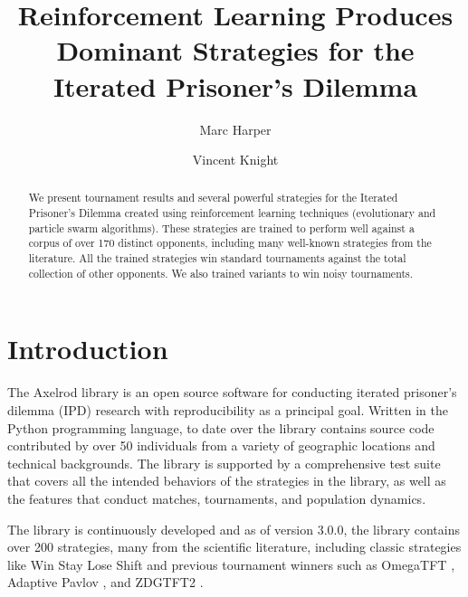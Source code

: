 \documentclass{article}
\title{Reinforcement Learning Produces Dominant Strategies for the
Iterated Prisoner's Dilemma}
\author{Marc Harper \and Vincent Knight} %
\date{}
\begin{document}
\maketitle

\begin{abstract}
    We present tournament results and several powerful strategies for the Iterated
    Prisoner's Dilemma created using reinforcement learning techniques
    (evolutionary and particle swarm algorithms). These strategies are
    trained to perform well against a corpus of over 170 distinct
    opponents, including many well-known strategies from the literature. All
    the trained strategies win standard tournaments against the total collection
    of other opponents. We also trained variants to win noisy tournaments.
\end{abstract}

\section{Introduction}\label{sec:introduction}

The Axelrod library \cite{axelrodproject, knight2016open} is an open source
software for conducting iterated prisoner's dilemma (IPD) research with
reproducibility as a principal goal. Written in the Python programming language,
to date over the library contains source code contributed by over 50 individuals
from a variety of geographic locations and technical backgrounds. The library
is supported by a comprehensive test suite that covers all the intended
behaviors of the strategies in the library, as well as the features that
conduct matches, tournaments, and population dynamics.

The library is continuously developed and as of version 3.0.0, the library
contains over 200 strategies, many from the scientific literature, including
classic strategies like Win Stay Lose Shift \cite{nowak1993strategy} and
previous tournament winners such as OmegaTFT \cite{slany2007some}, Adaptive
Pavlov \cite{li2007design}, and ZDGTFT2 \cite{stewart2012extortion}.

\end{document}
